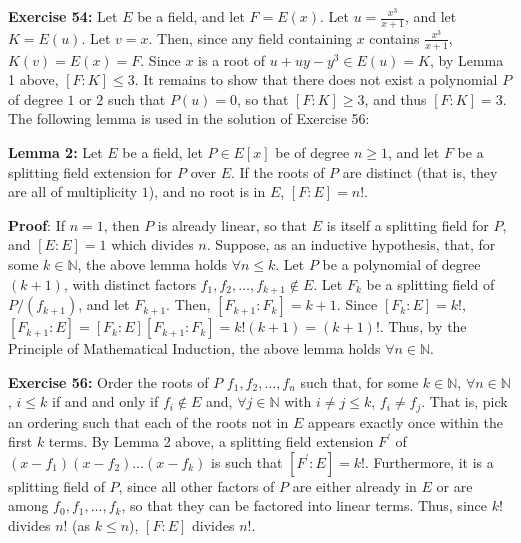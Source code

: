 \documentclass{article}%
\begin{document}
\textbf{Exercise 54:} Let $E$ be a field, and let $F = E(x)$. Let $u =
\frac{x^3}{x + 1}$, and let $K = E(u)$. Let $v = x$. Then, since any field
containing $x$ contains $\frac{x^3}{x + 1}$, $K(v) = E(x) = F$. Since $x$ is a
root of $u + uy - y^3 \in E(u) = K$, by Lemma 1 above, $[F : K] \leq 3$.
It remains to show that there does not exist a polynomial $P$ of degree $1$ or
$2$ such that $P(u) = 0$, so that $[F : K] \geq 3$, and thus $[F : K] = 3$. \\

The following lemma is used in the solution of Exercise 56:

\textbf{Lemma 2:} Let $E$ be a field, let $P \in E[x]$ be of degree $n \geq
1$, and let $F$ be a splitting field extension for $P$ over $E$. If the roots
of $P$ are distinct (that is, they are all of multiplicity $1$), and no root
is in $E$, $[F : E] = n!$.

\textbf{Proof}: If $n = 1$, then $P$ is already linear, so that $E$ is itself
a splitting field for $P$, and $[E : E] = 1$ which divides $n$. Suppose, as an
inductive hypothesis, that, for some $k \in \mathbb{N}$, the above lemma holds
$\forall n \leq k$. Let $P$ be a polynomial of degree $(k + 1)$, with distinct
factors $f_1,f_2, \ldots, f_{k + 1} \not \in E$. Let $F_{k}$ be a splitting
field of $P/(f_{k + 1})$, and let $F_{k + 1}$. Then,
$[F_{k + 1} :F_k] = k + 1$. Since $[F_k : E] = k!$, $[F_{k + 1} : E]
 = [F_k : E] [F_{k + 1} :F_k] = k!(k + 1) = (k + 1)!$. Thus, by the Principle
of Mathematical Induction, the above lemma holds $\forall n \in \mathbb{N}$.

\textbf{Exercise 56:} Order the roots of $P$ $f_1, f_2, \ldots, f_n$ such
that, for some $k \in \mathbb{N}$, $\forall n \in \mathbb{N}$, $i \leq k$ if
and and only if $f_i \not \in E$ and, $\forall j \in \mathbb{N}$ with
$i \neq j \leq k$, $f_i \neq f_j$. That is, pick an ordering such that each of
the roots not in $E$ appears exactly once within the first $k$ terms. By Lemma
2 above, a splitting field extension $F^{\prime}$ of
$(x - f_1)(x - f_2) \ldots (x - f_k)$ is such that $[F^{\prime} : E] = k!$.
Furthermore, it is a splitting field of $P$, since all other factors of $P$
are either already in $E$ or are among $f_0, f_1, \ldots, f_k$, so that they
can be factored into linear terms. Thus, since $k!$ divides $n!$ (as $k \leq
n$), $[F : E]$ divides $n!$.
\end{document}
